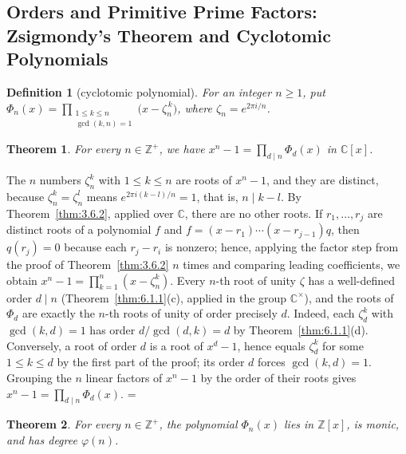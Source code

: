\documentclass[11pt]{article}
\makeatletter
\theoremstyle{ntstyle}
\newtheorem{theorem}{Theorem}[subsection]
\newtheorem{definition}{Definition}[subsection]
\let\nt@closedisplay\]
\def\nt@guardedclose{\@ifnextchar\par{\nt@closeafterpar}{\@ifnextchar\end{\postdisplaypenalty\@M\nt@closedisplay}{\nt@closedisplay}}}
\def\nt@closeafterpar\par{\@ifnextchar\par{\nt@closeafterpar}{\@ifnextchar\end{\postdisplaypenalty\@M\nt@closedisplay\par}{\nt@closedisplay\par}}}
\renewenvironment{proof}[1][\proofname]{\par
  \pushQED{\qed}\normalfont\topsep\medskipamount\edef\nt@afterproof{\@endparpenalty=\the\@endparpenalty\relax}\@beginparpenalty\@M\@endparpenalty\@M\let\]\nt@guardedclose\trivlist\item[]\textit{#1\@addpunct{.}} \ignorespaces}{\ifvmode\addpenalty\@M\fi\popQED\nt@afterproof\endtrivlist\@endpefalse}
\makeatother
\begin{document}
\subsection{Orders and Primitive Prime Factors: Zsigmondy's Theorem and Cyclotomic Polynomials}

\begin{definition}[cyclotomic polynomial]\label{def:6.11.1}
	For an integer $n\ge1$, put $\Phi_n(x) = \prod_{\substack{1 \le k \le n \\ \gcd(k, n) = 1}}\big(x
		- \zeta_n^{\,k}\big)$, where $\zeta_n = e^{2\pi i / n}$.
\end{definition}
\begin{theorem}\label{thm:6.11.1} For every $n\in\mathbb{Z}^+$, we have $x^{n} - 1 = \prod_{d \mid n} \Phi_d(x)$ in $\mathbb{C}[x]$.
\end{theorem}

\begin{proof} The $n$ numbers $\zeta_n^k$ with $1\le k\le n$ are roots of
	$x^n-1$, and they are distinct, because $\zeta_n^k=\zeta_n^l$ means
	$e^{2\pi i(k-l)/n}=1$, that is, $n\mid k-l$. By Theorem~\ref{thm:3.6.2},
	applied over $\mathbb{C}$, there are no other roots. If $r_1,\ldots,r_j$
	are distinct roots of a polynomial $f$ and $f=(x-r_1)\cdots(x-r_{j-1})q$,
	then $q(r_j)=0$ because each $r_j-r_i$ is nonzero; hence, applying the factor step
	from the proof of Theorem~\ref{thm:3.6.2} $n$ times and comparing leading coefficients, we obtain
	$x^n-1=\prod_{k=1}^{n}(x-\zeta_n^k)$. Every $n$-th root of unity
	$\zeta$ has a well-defined order $d \mid n$
	(Theorem~\ref{thm:6.1.1}(c), applied in the group $\mathbb{C}^{\times}$),
	and the roots of $\Phi_d$ are exactly the $n$-th roots of unity of
	order precisely $d$. Indeed, each $\zeta_d^k$ with $\gcd(k,d)=1$ has order
	$d/\gcd(d,k)=d$ by Theorem~\ref{thm:6.1.1}(d). Conversely, a root of
	order $d$ is a root of $x^d-1$, hence equals $\zeta_d^k$ for some
	$1\le k\le d$ by the first part of the proof; its order $d$
	forces $\gcd(k,d)=1$. Grouping the $n$ linear factors of $x^{n} - 1$
	by the order of their roots gives $x^{n} - 1 = \prod_{d \mid n} \Phi_d(x)$.
\end{proof}
\begin{theorem}\label{thm:6.11.2} For every $n\in\mathbb{Z}^+$, the polynomial $\Phi_n(x)$ lies in $\mathbb{Z}[x]$, is
	monic, and has degree $\varphi(n)$.
\end{theorem}
\end{document}
